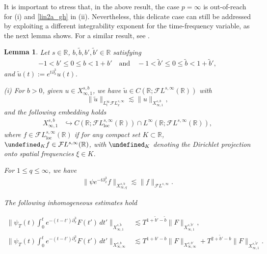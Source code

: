 \documentclass[a4paper,
11pt,  reqno]{amsart}
\newcommand{\5}{\textup{V}}
\newcommand{\noi}{\noindent}
\newcommand{\FL}{\mathcal{F} L}
\newcommand{\les}{\lesssim}
\newcommand{\wt}{\widetilde}
\newcommand{\embeds}{\hookrightarrow}
\newcommand{\dx}{\partial_x}
\newtheorem{lemma}[theorem]{Lemma}
\theoremstyle{remark}
\newcommand{\R}{\mathbb{R}}
\let\P= \undefined
\newcommand{\P}{\mathbf{P}}
\numberwithin{equation}{section}
\numberwithin{theorem}{section}
\begin{document}
		It is important to stress that, in the above result, the case $p=\infty$ is out-of-reach {for (i) and \eqref{lin2a_gh} in (ii)}. Nevertheless, this delicate case can still be addressed by exploiting a different integrability exponent for the time-frequency variable, as the next lemma shows. For a similar result, see \cite[Section 7]{CC24}.

		\begin{lemma}\label{lem:linear_estimates}
			Let $s\in\R$, $b,\wt b, b', \wt b'\in\R$ satisfying
            \begin{align}
                \label{bs}
                -1 < b' \le 0 \le b < 1 + b'
                \quad
                \text{and}
                \quad
                -1 < \wt b' \le 0 \le \wt b < 1 + \wt b',
            \end{align}
        and $\wt u(t) := e^{t\dx^3 } u(t)$.

            \noi
			{\rm(i)} For $b>0$,  given $u\in X^{s,b}_{\infty,1}$, we have $\wt{u}\in C(\R;\FL^{s,\infty}(\R))$ with
			\begin{equation}\label{lin}
				\|\wt{u}\|_{L^\infty_t\FL^{s, \infty}_x}\lesssim \|u\|_{X^{s,b}_{\infty,1}},
			\end{equation}
			and the following embedding holds
			\noi
			\begin{align}
				X^{s,b}_{\infty, 1} &
                \embeds C(\R; \FL_{\mathrm{loc}}^{s,\infty}(\R))\cap L^\infty(\R; \FL^{s,\infty}(\R)),
			\end{align}
            where $f \in \FL^{s, \infty}_{\mathrm{loc}}(\R)$ if for any compact set $K\subset \R$, $\P_K f \in \FL^{s, \infty}(\R)$, with $\P_K$  denoting the Dirichlet projection onto spatial frequencies $ \xi \in K$.



			\smallskip

			\noi {\rm(ii)}
            For $ 1 \le q \le \infty$, we have
			\begin{align}
				\label{lin1}
				\| \psi e^{-t\dx^3} f \|_{X^{s,b}_{\infty,q}} \les \| f \|_{\FL^{s,\infty}}.
			\end{align}


			\noi{\rm(iii)}
            The following inhomogeneous estimates hold

			\noi
			\begin{align}
				\label{lin2a}
				\bigg\| \psi_T (t) \int_0^t e^{-(t-t')\dx^3 } F(t') \, dt' \bigg\|_{X^{s,\wt{b}}_{\infty,1} } & \les T^{1+\wt{b}'-\wt{b}} \| F \|_{X^{s,\wt{b}'}_{\infty,1}}
                ,
            \\
				\label{lin2b}
				\bigg\| \psi_T (t) \int_0^t e^{-(t-t')\dx^3} F(t') \, dt' \bigg\|_{X^{s,b}_{\infty, \infty} }
                &
                \les T^{1+b'-b} \| F\|_{X^{s, b'}_{\infty, \infty}} + T^{2+\wt{b}' -b} \|F\|_{X^{s, \wt{b}'}_{\infty, 1}}.
			\end{align}



		\end{lemma}
\end{document}
